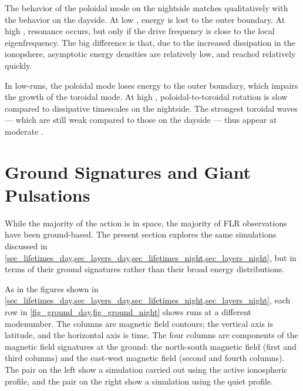 
The behavior of the poloidal mode on the nightside matches qualitatively with the behavior on the dayside. At low \azm, energy is lost to the outer boundary. At high \azm, resonance occurs, but only if the drive frequency is close to the local eigenfrequency. The big difference is that, due to the increased dissipation in the ionopshere, asymptotic energy densities are relatively low, and reached relatively quickly. 

In low-\azm runs, the poloidal mode loses energy to the outer boundary, which impairs the growth of the toroidal mode. At high \azm, poloidal-to-toroidal rotation is slow compared to dissipative timescales on the nightside. The strongest toroidal waves --- which are still weak compared to those on the dayside --- thus appear at moderate \azm. 









\section{Ground Signatures and Giant Pulsations}
  \label{sec_ground}

While the majority of the action is in space, the majority of FLR observations have been ground-based. The present section explores the same simulations discussed in \cref{sec_lifetimes_day,sec_layers_day,sec_lifetimes_night,sec_layers_night}, but in terms of their ground signatures rather than their broad energy distributions. 

As in the figures shown in \cref{sec_lifetimes_day,sec_layers_day,sec_lifetimes_night,sec_layers_night}, each row in \cref{fig_ground_day,fig_ground_night} shows runs at a different modenumber. The columns are magnetic field contours; the vertical axis is latitude, and the horizontal axis is time. The four columns are components of the magnetic field signatures at the ground:  the north-south magnetic field (first and third columns) and the east-west magnetic field (second and fourth columns). The pair on the left show a simulation carried out using the active ionospheric profile, and the pair on the right show a simulation using the quiet profile. 

